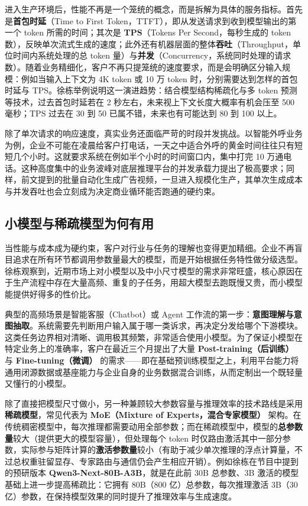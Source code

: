 \documentclass[UTF8,a4paper,11pt,fontset=fandol]{ctexart}
\begin{document}
进入生产环境后，性能不再是一个笼统的概念，而是拆解为具体的服务指标。首先是\textbf{首包时延}（Time to First Token，TTFT），即从发送请求到收到模型输出的第一个 token 所需的时间；其次是 \textbf{TPS}（Tokens Per Second，每秒生成的 token 数），反映单次流式生成的速度；此外还有机器层面的整体\textbf{吞吐}（Throughput，单位时间内系统处理的总 token 量）与\textbf{并发}（Concurrency，系统同时处理的请求数）。随着业务精细化，客户不再只提笼统的速度要求，而是会明确区分输入规模：例如当输入上下文为 4K token 或 10 万 token 时，分别需要达到怎样的首包时延与 TPS。徐栋举例说明这一演进趋势：结合模型结构稀疏化与多 token 预测等技术，过去首包时延若在 2 秒左右，未来视上下文长度大概率有机会压至 500 毫秒；TPS 过去在 30 到 50 已属不错，未来也有可能达到 80 到 100 以上。

除了单次请求的响应速度，真实业务还面临严苛的时段并发挑战。以智能外呼业务为例，企业不可能在凌晨给客户打电话，一天之中适合外呼的黄金时间往往只有短短几个小时。这就要求系统在例如半个小时的时间窗口内，集中打完 10 万通电话。这种高度集中的业务波峰对底层推理平台的并发承载力提出了极高要求；同样，前文提到的批量自动化生成广告视频，一旦进入规模化生产，其单次生成成本与并发吞吐也会立刻成为决定商业循环能否跑通的硬约束。

\subsection{小模型与稀疏模型为何有用}
当性能与成本成为硬约束，客户对行业与任务的理解也变得更加精细。企业不再盲目追求在所有环节都调用参数量最大的模型，而是开始根据任务特性做分级选型。徐栋观察到，近期市场上对小模型以及中小尺寸模型的需求非常旺盛，核心原因在于生产流程中存在大量高频、重复的子任务，用超大模型去跑既慢又贵，而小模型能提供好得多的性价比。

典型的高频场景是智能客服（Chatbot）或 Agent 工作流的第一步：\textbf{意图理解与意图抽取}。系统需要先判断用户输入属于哪一类诉求，再决定分发给哪个下游模块。这类任务边界相对清晰、调用极其频繁，非常适合使用小模型。为了保证小模型在特定业务上的准确率，客户在最近三个月提出了大量 \textbf{Post-training（后训练）} 与 \textbf{Fine-tuning（微调）} 的需求——即在基础预训练模型之上，利用平台能力将通用闭源数据或基座能力与企业自身的业务数据混合训练，从而定制出一个既轻量又懂行的小模型。

除了直接把模型尺寸做小，另一种兼顾较大参数容量与推理效率的技术路线是采用\textbf{稀疏模型}，常见代表为 \textbf{MoE（Mixture of Experts，混合专家模型）} 架构。在传统稠密模型中，每次推理都需要动用全部参数；而在稀疏模型中，模型的\textbf{总参数量}较大（提供更大的模型容量），但处理每个 token 时仅路由激活其中一部分参数，实际参与矩阵计算的\textbf{激活参数量}较小（有助于减少单次推理的浮点计算量，不过总权重驻留显存、专家路由与通信仍会产生相应开销）。例如徐栋在节目中提到的预研版本 \textbf{Qwen3-Next-80B-A3B}，就是在此前 30B 总参数、3B 激活的模型基础上进一步提高稀疏比：它拥有 80B（800 亿）总参数，每次推理激活 3B（30 亿）参数，在保持模型效果的同时提升了推理效率与生成速度。
\end{document}

